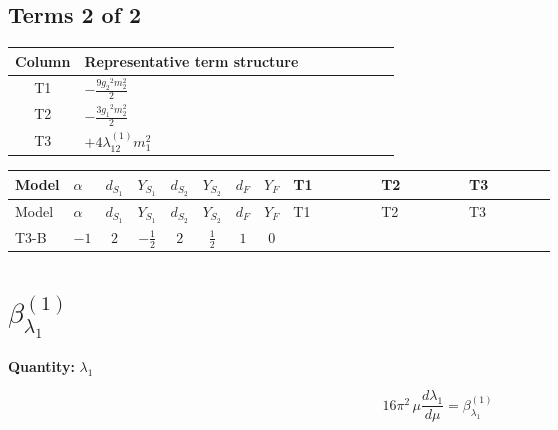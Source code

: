 \documentclass[8pt]{article}
\begin{document}
\begin{landscape}
\subsection*{Terms 2 of 2}
\begin{center}
\begin{tabular}{@{}c >{\raggedright\arraybackslash}p{0.82\linewidth}@{}}
\toprule
Column & Representative term structure \\
\midrule
T1 & \(\displaystyle -\frac{9 {g_2}^2 {m_2^2}}{2}\) \\
\midrule
T2 & \(\displaystyle -\frac{3 {g_1}^2 {m_2^2}}{2}\) \\
\midrule
T3 & \(\displaystyle +4 {\lambda_{12}^{(1)}} {m_1^2}\) \\
\midrule
\bottomrule
\end{tabular}
\end{center}
\smallskip
\tiny
\begin{longtable}{@{}llcccccc >{\raggedright\arraybackslash}p{0.21\linewidth} >{\raggedright\arraybackslash}p{0.21\linewidth} >{\raggedright\arraybackslash}p{0.21\linewidth}@{}}
\toprule
Model & $\alpha$ & $d_{S_1}$ & $Y_{S_1}$ & $d_{S_2}$ & $Y_{S_2}$ & $d_F$ & $Y_F$ & T1 & T2 & T3 \\
\midrule
\endfirsthead
\toprule
Model & $\alpha$ & $d_{S_1}$ & $Y_{S_1}$ & $d_{S_2}$ & $Y_{S_2}$ & $d_F$ & $Y_F$ & T1 & T2 & T3 \\
\midrule
\endhead
T3-B & $-1$ & $2$ & $-\frac{1}{2}$ & $2$ & $\frac{1}{2}$ & $1$ & $0$ & \scriptsize\adjustbox{max width=\linewidth}{$\begin{gathered} -\frac{9 {g_2}^2 {m_2^2}}{2}\end{gathered}$} & \scriptsize\adjustbox{max width=\linewidth}{$\begin{gathered} -\frac{3 {g_1}^2 {m_2^2}}{2}\end{gathered}$} & \scriptsize\adjustbox{max width=\linewidth}{$\begin{gathered} +4 {\lambda_{12}^{(1)}} {m_1^2}\end{gathered}$} \\
\midrule
\bottomrule
\end{longtable}
\clearpage
\section*{$\beta_{\lambda_1}^{(1)}$}
\noindent\textbf{Quantity: }$\lambda_1$\par\smallskip
\[16\pi^2\,\mu\frac{d \lambda_1}{d\mu}=\beta_{\lambda_1}^{(1)}\]

\end{landscape}
\end{document}
